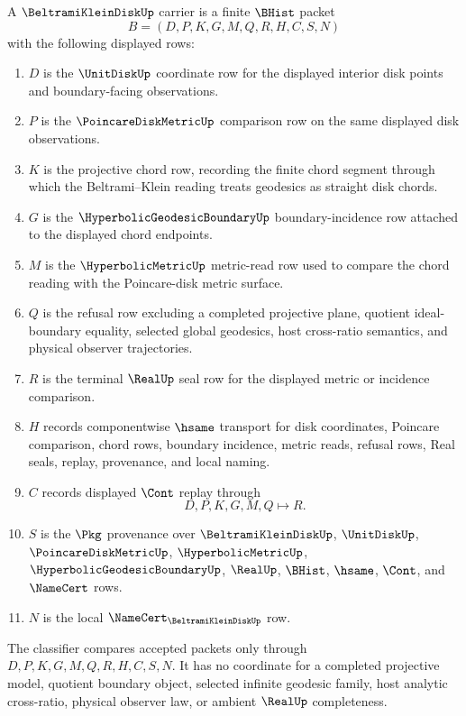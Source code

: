 \begin{definition}
\label{def:beltrami-klein-disk-carrier}
A $\BeltramiKleinDiskUp$ carrier is a finite $\BHist$ packet
$$
B=(D,P,K,G,M,Q,R,H,C,S,N)
$$
with the following displayed rows:
\begin{enumerate}
\item $D$ is the $\UnitDiskUp$ coordinate row for the displayed interior disk points and boundary-facing observations.
\item $P$ is the $\PoincareDiskMetricUp$ comparison row on the same displayed disk observations.
\item $K$ is the projective chord row, recording the finite chord segment through which the Beltrami--Klein reading treats geodesics as straight disk chords.
\item $G$ is the $\HyperbolicGeodesicBoundaryUp$ boundary-incidence row attached to the displayed chord endpoints.
\item $M$ is the $\HyperbolicMetricUp$ metric-read row used to compare the chord reading with the Poincare-disk metric surface.
\item $Q$ is the refusal row excluding a completed projective plane, quotient ideal-boundary equality, selected global geodesics, host cross-ratio semantics, and physical observer trajectories.
\item $R$ is the terminal $\RealUp$ seal row for the displayed metric or incidence comparison.
\item $H$ records componentwise $\hsame$ transport for disk coordinates, Poincare comparison, chord rows, boundary incidence, metric reads, refusal rows, Real seals, replay, provenance, and local naming.
\item $C$ records displayed $\Cont$ replay through
$$
D,P,K,G,M,Q \longmapsto R.
$$
\item $S$ is the $\Pkg$ provenance over $\BeltramiKleinDiskUp$, $\UnitDiskUp$, $\PoincareDiskMetricUp$, $\HyperbolicMetricUp$, $\HyperbolicGeodesicBoundaryUp$, $\RealUp$, $\BHist$, $\hsame$, $\Cont$, and $\NameCert$ rows.
\item $N$ is the local $\NameCert_{\BeltramiKleinDiskUp}$ row.
\end{enumerate}
The classifier compares accepted packets only through $D,P,K,G,M,Q,R,H,C,S,N$. It has no coordinate for a completed projective model, quotient boundary object, selected infinite geodesic family, host analytic cross-ratio, physical observer law, or ambient $\RealUp$ completeness.
\end{definition}

